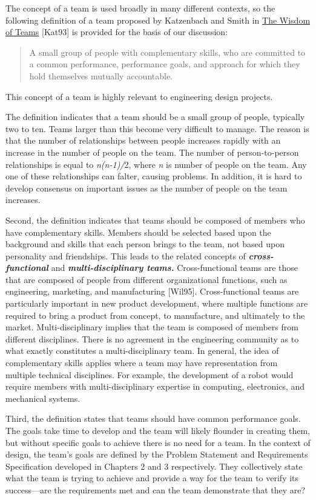 The concept of a team is used broadly in many different contexts, so the
following definition of a team proposed by Katzenbach and Smith in
\ul{The Wisdom of Teams} {[}Kat93{]} is provided for the basis of our
discussion:

\begin{quote}
A small group of people with complementary skills, who are committed to
a common performance, performance goals, and approach for which they
hold themselves mutually accountable.
\end{quote}

This concept of a team is highly relevant to engineering design
projects.

The definition indicates that a team should be a small group of people,
typically two to ten. Teams larger than this become very difficult to
manage. The reason is that the number of relationships between people
increases rapidly with an increase in the number of people on the team.
The number of person-to-person relationships is equal to
\emph{n(n-1)/}2, where \emph{n} is number of people on the team. Any one
of these relationships can falter, causing problems. In addition, it is
hard to develop consensus on important issues as the number of people on
the team increases.

Second, the definition indicates that teams should be composed of
members who have complementary skills. Members should be selected based
upon the background and skills that each person brings to the team, not
based upon personality and friendships. This leads to the related
concepts of \emph{\textbf{cross-functional}} and
\emph{\textbf{multi-disciplinary teams.}} Cross-functional teams are
those that are composed of people from different organizational
functions, such as engineering, marketing, and manufacturing
{[}Wil95{]}. Cross-functional teams are particularly important in new
product development, where multiple functions are required to bring a
product from concept, to manufacture, and ultimately to the market.
Multi-disciplinary implies that the team is composed of members from
different disciplines. There is no agreement in the engineering
community as to what exactly constitutes a multi-disciplinary team. In
general, the idea of complementary skills applies where a team may have
representation from multiple technical disciplines. For example, the
development of a robot would require members with multi-disciplinary
expertise in computing, electronics, and mechanical systems.

Third, the definition states that teams should have common performance
goals. The goals take time to develop and the team will likely flounder
in creating them, but without specific goals to achieve there is no need
for a team. In the context of design, the team's goals are defined by
the Problem Statement and Requirements Specification developed in
Chapters 2 and 3 respectively. They collectively state what the team is
trying to achieve and provide a way for the team to verify its
success---are the requirements met and can the team demonstrate that
they are?

